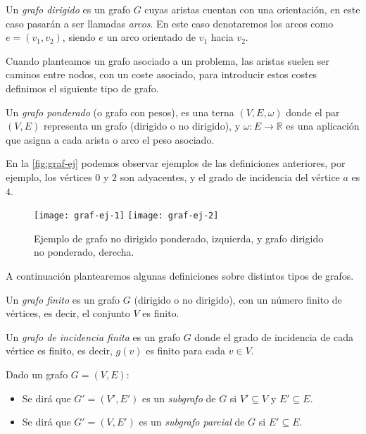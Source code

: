 \begin{definicion}
	Un \textit{grafo dirigido} es un grafo $G$ cuyas aristas cuentan con una orientación, en este caso pasarán a ser llamadas \textit{arcos}. En este caso denotaremos los arcos como $e=(v_1,v_2)$, siendo $e$ un arco orientado de $v_1$ hacia $v_2$.
\end{definicion}

Cuando planteamos un grafo asociado a un problema, las aristas suelen ser caminos entre nodos, con un coste asociado, para introducir estos costes definimos el siguiente tipo de grafo.

\begin{definicion}
	Un \textit{grafo ponderado} (o grafo con pesos), es una terna $(V,E,\omega)$ donde el par $(V,E)$ representa un grafo (dirigido o no dirigido), y $\omega:E\rightarrow\mathbb{R}$ es una aplicación que asigna a cada arista o arco el peso asociado.
\end{definicion}

En la \autoref{fig:graf-ej} podemos observar ejemplos de las definiciones anteriores, por ejemplo, los vértices $0$ y $2$ son adyacentes, y el grado de incidencia del vértice $a$ es $4$. \\

\begin{figure}[htb]
	\centering
	\texttt{[image: graf-ej-1]}
	\texttt{[image: graf-ej-2]}
	\caption{Ejemplo de grafo no dirigido ponderado, izquierda, y grafo dirigido no ponderado, derecha.}
	\label{fig:graf-ej}
\end{figure}

A continuación plantearemos algunas definiciones sobre distintos tipos de grafos.

\begin{definicion}
	Un \textit{grafo finito} es un grafo $G$ (dirigido o no dirigido), con un número finito de vértices, es decir, el conjunto $V$ es finito.
\end{definicion}

\begin{definicion}
	Un \textit{grafo de incidencia finita} es un grafo $G$ donde el grado de incidencia de cada vértice es finito, es decir, $g(v)$ es finito para cada $v\in V$.
\end{definicion}

\begin{definicion}
	Dado un grafo $G=(V,E)$: 
	\begin{itemize}
		\item Se dirá que $G'=(V',E')$ es un \textit{subgrafo} de $G$ si $V'\subseteq V$ y $E'\subseteq E$.
		\item Se dirá que $G'=(V,E')$ es un \textit{subgrafo parcial} de $G$ si $E'\subseteq E$.
	\end{itemize} 
\end{definicion}

